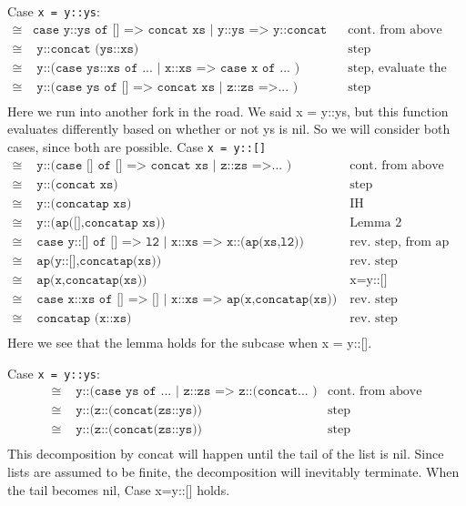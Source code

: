 \documentclass[11pt,letterpaper]{article}
\begin{document}
Case \texttt{x = y::ys}:
\begin{align*}
\cong & \texttt{case y::ys of [] => concat xs | y::ys => y::concat (ys::xs) )} & \text{cont. from above}\\
\cong & \texttt{ y::concat (ys::xs) } & \text{step}\\
\cong & \texttt{ y::(case ys::xs of ... | x::xs => case x of ... )} & \text{step, evaluate the case}\\
\cong & \texttt{ y::(case ys of [] => concat xs | z::zs =>... )} & \text{step}\\
\end{align*}
Here we run into another fork in the road. We said x = y::ys, but this function
evaluates differently based on whether or not ys is nil. So we will consider both cases, 
since both are possible.
Case \texttt{x = y::[]}
\begin{align*}
\cong & \texttt{ y::(case [] of [] => concat xs | z::zs =>... )} & \text{cont. from above}\\
\cong & \texttt{ y::(concat xs)} & \text{step}\\
\cong & \texttt{ y::(concatap xs)} & \text{IH}\\
\cong & \texttt{ y::(ap([],concatap xs))} & \text{Lemma 2}\\
\cong & \texttt{ case y::[] of [] => l2 | x::xs => x::(ap(xs,l2))} & \text{rev. step, from ap}\\
\cong & \texttt{ ap(y::[],concatap(xs))} & \text{rev. step}\\
\cong & \texttt{ ap(x,concatap(xs)) } & \text{x=y::[]}\\
\cong & \texttt{ case x::xs of [] => [] | x::xs => ap(x,concatap(xs)) } & \text{rev. step (concatap)}\\
\cong & \texttt{ concatap (x::xs) } & \text{rev. step}\\
\end{align*}
Here we see that the lemma holds for the subcase when x = y::[].

Case \texttt{x = y::ys}:
\begin{align*}
\cong & \texttt{ y::(case ys of ... | z::zs => z::(concat... )} & \text{cont. from above}\\
\cong & \texttt{ y::(z::(concat(zs::ys))} & \text{step}\\
\cong & \texttt{ y::(z::(concat(zs::ys))} & \text{step}\\
\end{align*}
This decomposition by concat will happen until the tail of the list is nil.
Since lists are assumed to be finite, the decomposition will inevitably terminate.
When the tail becomes nil, Case x=y::[] holds.
\end{document}
